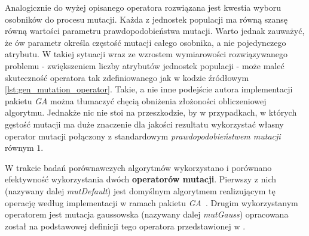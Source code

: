 Analogicznie do wyżej opisanego operatora rozwiązana jest kwestia wyboru osobników do procesu mutacji. Każda z jednostek populacji ma równą szansę równą wartości parametru prawdopodobieństwa mutacji. Warto jednak zauważyć, że ów parametr określa częstość mutacji całego osobnika, a nie pojedynczego atrybutu. W takiej sytuacji wraz ze wzrostem wymiarowości rozwiązywanego problemu - zwiększeniem liczby atrybutów jednostek populacji - może maleć skuteczność operatora tak zdefiniowanego jak w kodzie źródłowym \ref{lst:gen_mutation_operator}. Takie, a nie inne podejście autora implementacji pakietu \emph{GA} można tłumaczyć chęcią obniżenia złożoności obliczeniowej algorytmu. Jednakże nic nie stoi na przeszkodzie, by w przypadkach, w których gęstość mutacji ma duże znaczenie dla jakości rezultatu wykorzystać własny operator mutacji połączony z standardowym \emph{prawdopodobieństwem mutacji} równym $1$.


\par
W trakcie badań porównawczych algorytmów wykorzystano i porównano efektywność wykorzystania dwóch \textbf{operatorów mutacji}. Pierwszy z nich (nazywany dalej \emph{mutDefault}) jest domyślnym algorytmem realizującym tę operację według implementacji w ramach pakietu \emph{GA}~\cite{gaPackage}. Drugim wykorzystanym operatorem jest mutacja gaussowska (nazywany dalej \emph{mutGauss}) opracowana został na podstawowej definicji tego operatora przedstawionej w \cite{arabas2001wyklady}. 

